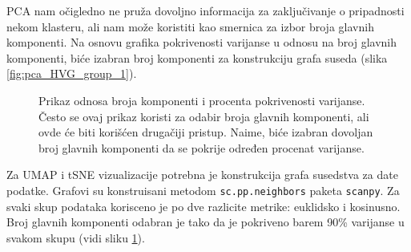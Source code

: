 \documentclass{article}
\begin{document}
PCA nam očigledno ne pruža dovoljno informacija za zaključivanje o pripadnosti nekom klasteru, ali nam može koristiti kao smernica za izbor broja glavnih komponenti. Na osnovu grafika pokrivenosti varijanse u odnosu na broj glavnih komponenti, biće izabran broj komponenti za konstrukciju grafa suseda (slika \ref{fig:pca_HVG_group_1}). 

\begin{figure}[!h]
    \centering
    \caption{ Prikaz odnosa broja komponenti i procenta pokrivenosti varijanse. Često se ovaj prikaz koristi za odabir broja glavnih komponenti, ali ovde će biti korišćen drugačiji pristup. Naime, biće izabran dovoljan broj glavnih komponenti da se pokrije određen procenat varijanse. }
    \label{fig:variance_ratios}
\end{figure}

Za UMAP i tSNE vizualizacije potrebna je konstrukcija grafa susedstva za date podatke. Grafovi su konstruisani metodom \lstinline{sc.pp.neighbors} paketa \lstinline{scanpy}. Za svaki skup podataka korisceno je po dve razlicite metrike: euklidsko i kosinusno. Broj glavnih komponenti odabran je tako da je pokriveno barem 90\% varijanse u svakom skupu (vidi sliku \ref{fig:variance_ratios}).
\end{document}
